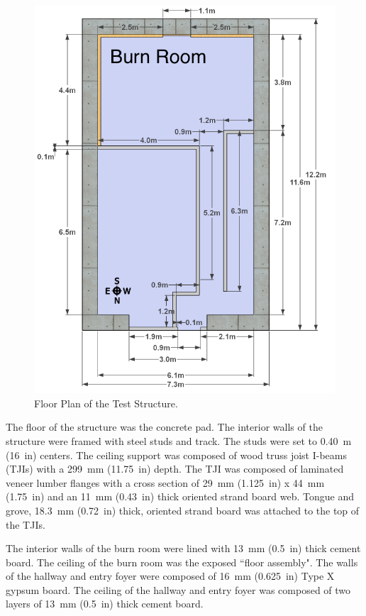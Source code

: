 \documentclass[12pt,oneside]{book}
\begin{document}
\begin{figure}[!ht]
	\includegraphics[width=6in]{../Figures/Pictures/DelCoSingleStoryDimensionsMetric}
	\caption{Floor Plan of the Test Structure.}
	\label{fig:Test_Structure_Floor_Plan}
\end{figure}

The floor of the structure was the concrete pad. The interior walls of the structure were framed with steel studs and track.  The studs were set to 0.40~m (16~in) centers. The ceiling support was composed of wood truss joist I-beams (TJIs) with a 299~mm (11.75~in) depth. The TJI was composed of laminated veneer lumber flanges with a cross section of 29~mm (1.125~in) x 44~mm (1.75~in) and an 11~mm (0.43~in) thick oriented strand board web. Tongue and grove, 18.3~mm (0.72~in) thick, oriented strand board was attached to the top of the TJIs.

The interior walls of the burn room were lined with 13~mm (0.5~in) thick cement board. The ceiling of the burn room was the exposed ``floor assembly". The walls of the hallway and entry foyer were composed of 16~mm (0.625~in) Type X gypsum board. The ceiling of the hallway and entry foyer was composed of two layers of 13~mm (0.5~in) thick cement board.
\end{document}
